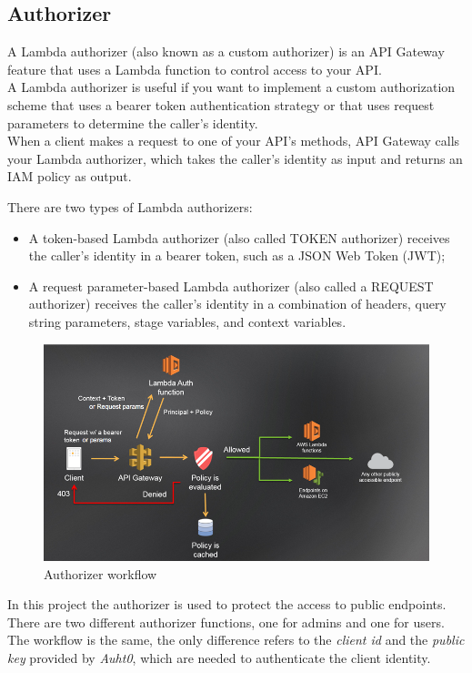 \subsection{Authorizer}
A Lambda authorizer (also known as a custom authorizer) is an API Gateway feature that uses a Lambda function to control access to your API.\\
A Lambda authorizer is useful if you want to implement a custom authorization scheme that uses a bearer token authentication strategy or that uses request parameters to determine the caller's identity.\\
When a client makes a request to one of your API's methods, API Gateway calls your Lambda authorizer, which takes the caller's identity as input and returns an IAM policy as output.

There are two types of Lambda authorizers:
\begin{itemize}
	\item A token-based Lambda authorizer (also called TOKEN authorizer) receives the caller's identity in a bearer token, such as a JSON Web Token (JWT);

	\item A request parameter-based Lambda authorizer (also called a REQUEST authorizer) receives the caller's identity in a combination of headers, query string parameters, stage variables, and context variables.
\end{itemize}
\begin{figure} [H]
	\centering
	\includegraphics[scale=0.6]{../Img/authorizer}
	\caption{Authorizer workflow}\label{}
\end{figure}

In this project the authorizer is used to protect the access to public endpoints. There are two different authorizer functions, one for admins and one for users. The workflow is the same, the only difference refers to the \emph{client id} and the \emph{public key} provided by \emph{Auht0}, which are needed to authenticate the client identity.

